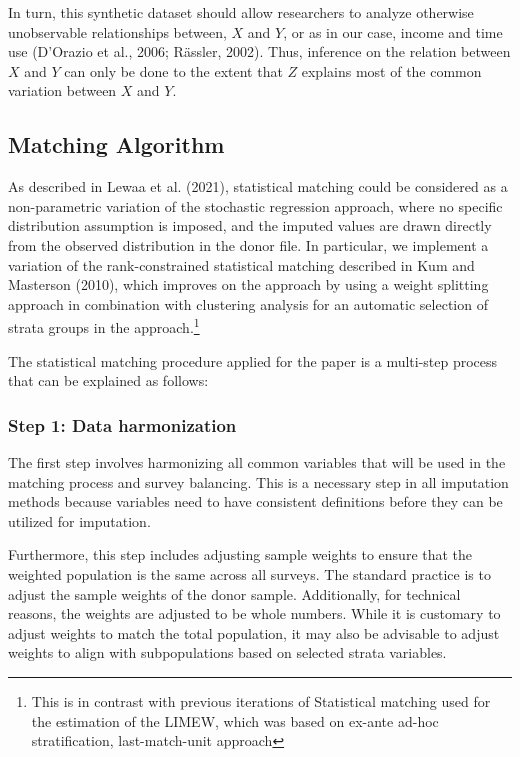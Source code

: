 \documentclass[
  11pt,
]{article}
\begin{document}
In turn, this synthetic dataset should allow researchers to analyze
otherwise unobservable relationships between, \(X\) and \(Y\), or as in
our case, income and time use (D'Orazio et al., 2006; Rässler, 2002).
Thus, inference on the relation between \(X\) and \(Y\) can only be done
to the extent that \(Z\) explains most of the common variation between
\(X\) and \(Y\).

\subsection{Matching Algorithm}\label{matching-algorithm}

As described in Lewaa et al. (2021), statistical matching could be
considered as a non-parametric variation of the stochastic regression
approach, where no specific distribution assumption is imposed, and the
imputed values are drawn directly from the observed distribution in the
donor file. In particular, we implement a variation of the
rank-constrained statistical matching described in Kum and Masterson
(2010), which improves on the approach by using a weight splitting
approach in combination with clustering analysis for an automatic
selection of strata groups in the approach.\footnote{ This is in
  contrast with previous iterations of Statistical matching used for the
  estimation of the LIMEW, which was based on ex-ante ad-hoc
  stratification, last-match-unit approach}

The statistical matching procedure applied for the paper is a multi-step
process that can be explained as follows:

\subsubsection{Step 1: Data
harmonization}\label{step-1-data-harmonization}

The first step involves harmonizing all common variables that will be
used in the matching process and survey balancing. This is a necessary
step in all imputation methods because variables need to have consistent
definitions before they can be utilized for imputation.

Furthermore, this step includes adjusting sample weights to ensure that
the weighted population is the same across all surveys. The standard
practice is to adjust the sample weights of the donor sample.
Additionally, for technical reasons, the weights are adjusted to be
whole numbers. While it is customary to adjust weights to match the
total population, it may also be advisable to adjust weights to align
with subpopulations based on selected strata variables.
\end{document}
